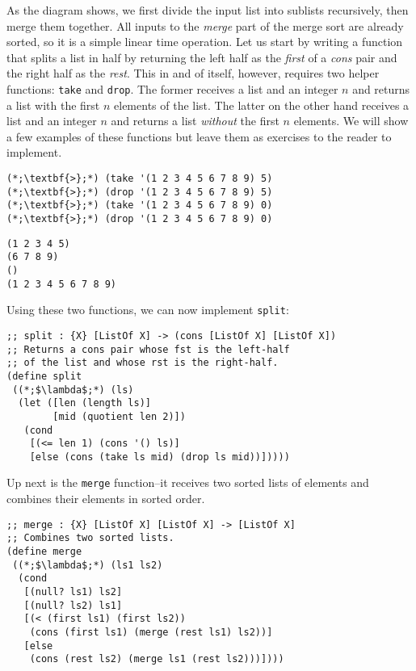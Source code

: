 As the diagram shows, we first divide the input list into sublists recursively, then merge them together. All inputs to the \textit{merge} part of the merge sort are already sorted, so it is a simple linear time operation. Let us start by writing a function that splits a list in half by returning the left half as the \textit{first} of a \textit{cons} pair and the right half as the \textit{rest}. This in and of itself, however, requires two helper functions: \texttt{take} and \texttt{drop}. The former receives a list and an integer $n$ and returns a list with the first $n$ elements of the list. The latter on the other hand receives a list and an integer $n$ and returns a list \textit{without} the first $n$ elements. We will show a few examples of these functions but leave them as exercises to the reader to implement.

\begin{cloast}[]{}
\begin{lstlisting}[language=MyNLNSOutput]
(*;\textbf{>};*) (take '(1 2 3 4 5 6 7 8 9) 5)
(*;\textbf{>};*) (drop '(1 2 3 4 5 6 7 8 9) 5)
(*;\textbf{>};*) (take '(1 2 3 4 5 6 7 8 9) 0)
(*;\textbf{>};*) (drop '(1 2 3 4 5 6 7 8 9) 0)
\end{lstlisting}
\tcblower
\begin{lstlisting}[language=MyOutput]
(1 2 3 4 5)
(6 7 8 9)
()
(1 2 3 4 5 6 7 8 9)
\end{lstlisting}
\end{cloast}

\noindent Using these two functions, we can now implement \texttt{split}:

\begin{cl}[]{}\begin{lstlisting}[language=MyScheme]
;; split : {X} [ListOf X] -> (cons [ListOf X] [ListOf X])
;; Returns a cons pair whose fst is the left-half 
;; of the list and whose rst is the right-half.
(define split
 ((*;$\lambda$;*) (ls)
  (let ([len (length ls)]
        [mid (quotient len 2)])
   (cond
    [(<= len 1) (cons '() ls)]
    [else (cons (take ls mid) (drop ls mid))]))))
\end{lstlisting}\end{cl}

Up next is the \texttt{merge} function--it receives two sorted lists of elements and combines their elements in sorted order.

\begin{cl}[]{}\begin{lstlisting}[language=MyScheme]
;; merge : {X} [ListOf X] [ListOf X] -> [ListOf X]
;; Combines two sorted lists.
(define merge
 ((*;$\lambda$;*) (ls1 ls2)
  (cond
   [(null? ls1) ls2]
   [(null? ls2) ls1]
   [(< (first ls1) (first ls2))
    (cons (first ls1) (merge (rest ls1) ls2))]
   [else 
    (cons (rest ls2) (merge ls1 (rest ls2)))])))
\end{lstlisting}\end{cl}

